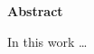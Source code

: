 \thispagestyle{empty}
\begin{titlepage}
\begin{center}
{\bf\Large Abstract}\\
\end{center}

\indent In this work \dots


\vfill
\end{titlepage}

